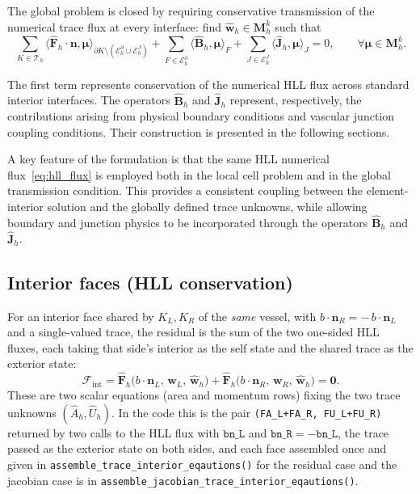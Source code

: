 \documentclass[11pt]{article}
\newcommand{\Th}{\mathcal{T}_h}
\newcommand{\Ehb}{\mathcal{E}_h^{\partial}}
\newcommand{\Ehj}{\mathcal{E}_h^{J}}
\begin{document}
The global problem is closed by requiring conservative transmission of the numerical trace flux at every interface: find
$\widehat{\mathbf w}_h\in\mathbf M_h^k$ such that
\begin{equation}
  \sum_{K\in\Th}
  \bigl\langle\widehat{\mathbf F}_h\cdot\bm n,\bm\mu\bigr\rangle
    _{\partial K\setminus(\Ehb\cup\Ehj)}
  +\sum_{F\in\Ehb}\bigl\langle\widehat{\mathbf B}_h,\bm\mu\bigr\rangle_F
  +\sum_{J\in\Ehj}\bigl\langle\widehat{\mathbf J}_h,\bm\mu\bigr\rangle_J
  =0,
  \qquad\forall\bm\mu\in\mathbf M_h^k .
  \label{eq:global_hdg}
\end{equation}

The first term represents conservation of the numerical HLL flux across
standard interior interfaces. The operators
$\widehat{\mathbf B}_h$ and $\widehat{\mathbf J}_h$
represent, respectively, the contributions arising from physical boundary
conditions and vascular junction coupling conditions. Their construction is
presented in the following sections.

A key feature of the formulation is that the same HLL numerical
flux~\eqref{eq:hll_flux} is employed both in the local cell problem and in
the global transmission condition. This provides a consistent coupling
between the element-interior solution and the globally defined trace
unknowns, while allowing boundary and junction physics to be incorporated
through the operators $\widehat{\mathbf B}_h$ and
$\widehat{\mathbf J}_h$.
\subsection{Interior faces (HLL conservation)}

For an interior face shared by $K_L,K_R$ of the \emph{same} vessel, with
$b\!\cdot\!\bm n_R=-\,b\!\cdot\!\bm n_L$ and a single-valued trace, the residual
is the sum of the two one-sided HLL fluxes, each taking that side's interior as
the self state and the shared trace as the exterior state:
\begin{equation}
  \mathcal F_{\mathrm{int}}
  =
  \widehat{\mathbf F}_h\bigl(b\!\cdot\!\bm n_L,\,\mathbf w_L,\,
  \widehat{\mathbf w}_h\bigr)
  +
  \widehat{\mathbf F}_h\bigl(b\!\cdot\!\bm n_R,\,\mathbf w_R,\,
  \widehat{\mathbf w}_h\bigr)
  =\mathbf 0 .
  \label{eq:interior_hll}
\end{equation}
These are two scalar equations (area and momentum rows) fixing the two trace
unknowns $(\widehat A_h,\widehat U_h)$. In the code this is the pair
\texttt{(FA\_L+FA\_R, FU\_L+FU\_R)} returned by two calls to the HLL flux with
$\mathtt{bn\_L}$ and $\mathtt{bn\_R}=-\mathtt{bn\_L}$, the trace passed as the
exterior state on both sides, and each face assembled once and given in \texttt{assemble\_trace\_interior\_eqautions()} for the residual case and the jacobian case is in \texttt{assemble\_jacobian\_trace\_interior\_eqautions()}.
\end{document}
